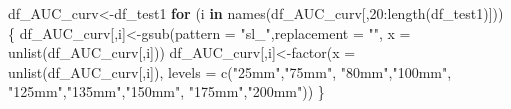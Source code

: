 \documentclass[
]{article}
\newenvironment{Shaded}{\begin{snugshade}}{\end{snugshade}}
\newcommand{\AttributeTok}[1]{\textcolor[rgb]{0.77,0.63,0.00}{#1}}
\newcommand{\ControlFlowTok}[1]{\textcolor[rgb]{0.13,0.29,0.53}{\textbf{#1}}}
\newcommand{\DecValTok}[1]{\textcolor[rgb]{0.00,0.00,0.81}{#1}}
\newcommand{\FunctionTok}[1]{\textcolor[rgb]{0.00,0.00,0.00}{#1}}
\newcommand{\NormalTok}[1]{#1}
\newcommand{\OtherTok}[1]{\textcolor[rgb]{0.56,0.35,0.01}{#1}}
\newcommand{\SpecialCharTok}[1]{\textcolor[rgb]{0.00,0.00,0.00}{#1}}
\newcommand{\StringTok}[1]{\textcolor[rgb]{0.31,0.60,0.02}{#1}}
\begin{document}
\begin{Shaded}
\begin{Highlighting}[]
\NormalTok{df\_AUC\_curv}\OtherTok{\textless{}{-}}\NormalTok{df\_test1}
\ControlFlowTok{for}\NormalTok{ (i }\ControlFlowTok{in} \FunctionTok{names}\NormalTok{(df\_AUC\_curv[,}\DecValTok{20}\SpecialCharTok{:}\FunctionTok{length}\NormalTok{(df\_test1)])) \{}
\NormalTok{  df\_AUC\_curv[,i]}\OtherTok{\textless{}{-}}\FunctionTok{gsub}\NormalTok{(}\AttributeTok{pattern =} \StringTok{"sl\_"}\NormalTok{,}\AttributeTok{replacement =} \StringTok{""}\NormalTok{,}
                        \AttributeTok{x =} \FunctionTok{unlist}\NormalTok{(df\_AUC\_curv[,i]))}
\NormalTok{  df\_AUC\_curv[,i]}\OtherTok{\textless{}{-}}\FunctionTok{factor}\NormalTok{(}\AttributeTok{x =} \FunctionTok{unlist}\NormalTok{(df\_AUC\_curv[,i]),}
                          \AttributeTok{levels =} \FunctionTok{c}\NormalTok{(}\StringTok{"25mm"}\NormalTok{,}\StringTok{"75mm"}\NormalTok{, }\StringTok{"80mm"}\NormalTok{,}\StringTok{"100mm"}\NormalTok{,}
                                     \StringTok{"125mm"}\NormalTok{,}\StringTok{"135mm"}\NormalTok{,}\StringTok{"150mm"}\NormalTok{,}
                                     \StringTok{"175mm"}\NormalTok{,}\StringTok{"200mm"}\NormalTok{))}
\NormalTok{  \}}


\end{Highlighting}
\end{Shaded}
\end{document}

